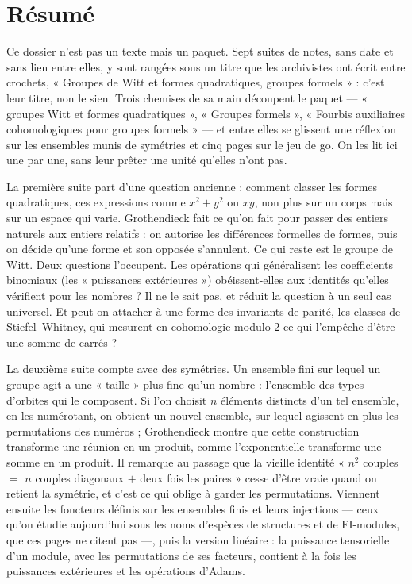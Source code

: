 \documentclass[11pt,a4paper]{article}
\begin{document}
\section*{Résumé}

\begin{resume}
Ce dossier n'est pas un texte mais un paquet. Sept suites de notes, sans
date et sans lien entre elles, y sont rangées sous un titre que les
archivistes ont écrit entre crochets, « Groupes de Witt et formes
quadratiques, groupes formels » : c'est leur titre, non le sien. Trois
chemises de sa main découpent le paquet — « groupes Witt et formes
quadratiques », « Groupes formels », « Fourbis auxiliaires cohomologiques
pour groupes formels » — et entre elles se glissent une réflexion sur les
ensembles munis de symétries et cinq pages sur le jeu de go. On les lit ici
une par une, sans leur prêter une unité qu'elles n'ont pas.

La première suite part d'une question ancienne : comment classer les formes
quadratiques, ces expressions comme $x^{2} + y^{2}$ ou $xy$, non plus sur un
corps mais sur un espace qui varie. Grothendieck fait ce qu'on fait pour
passer des entiers naturels aux entiers relatifs : on autorise les
différences formelles de formes, puis on décide qu'une forme et son opposée
s'annulent. Ce qui reste est le groupe de Witt. Deux questions l'occupent.
Les opérations qui généralisent les coefficients binomiaux (les « puissances
extérieures ») obéissent-elles aux identités qu'elles vérifient pour les
nombres ? Il ne le sait pas, et réduit la question à un seul cas universel.
Et peut-on attacher à une forme des invariants de parité, les classes de
Stiefel–Whitney, qui mesurent en cohomologie modulo $2$ ce qui l'empêche
d'être une somme de carrés ?

La deuxième suite compte avec des symétries. Un ensemble fini sur lequel un
groupe agit a une « taille » plus fine qu'un nombre : l'ensemble des types
d'orbites qui le composent. Si l'on choisit $n$ éléments distincts d'un tel
ensemble, en les numérotant, on obtient un nouvel ensemble, sur lequel
agissent en plus les permutations des numéros ; Grothendieck montre que
cette construction transforme une réunion en un produit, comme
l'exponentielle transforme une somme en un produit. Il remarque au passage
que la vieille identité « $n^{2}$ couples $=$ $n$ couples diagonaux $+$ deux
fois les paires » cesse d'être vraie quand on retient la symétrie, et c'est
ce qui oblige à garder les permutations. Viennent ensuite les foncteurs
définis sur les ensembles finis et leurs injections — ceux qu'on étudie
aujourd'hui sous les noms d'espèces de structures et de FI-modules, que ces
pages ne citent pas —, puis la version linéaire : la puissance
tensorielle d'un module, avec les permutations de ses facteurs, contient à
la fois les puissances extérieures et les opérations d'Adams.


\end{resume}
\end{document}
